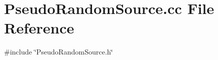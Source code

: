 \section{Pseudo\+Random\+Source.\+cc File Reference}
\label{PseudoRandomSource_8cc}
{\ttfamily \#include \char`\"{}Pseudo\+Random\+Source.\+h\char`\"{}}\newline
